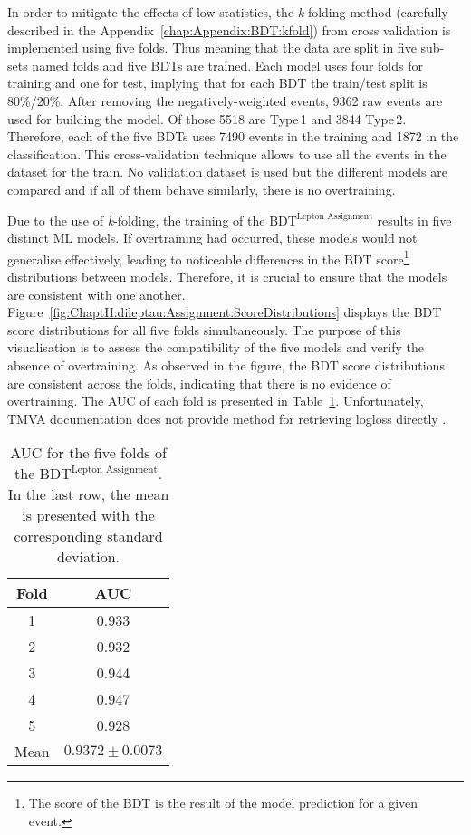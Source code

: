 In order to mitigate the effects of low statistics, the \textit{k}-folding method (carefully described in 
the Appendix~\ref{chap:Appendix:BDT:kfold}) from cross validation is implemented using five folds. 
Thus meaning that the data are split in five sub-sets named folds 
and five BDTs are trained. Each model uses four folds
for training and one for test, implying that for each BDT the train/test split is 80\%/20\%.
After removing the negatively-weighted events, 9362 raw events are used for building the model.
Of those 5518 are Type$\,$1 and 3844 Type$\,$2. Therefore, each of the five BDTs uses 7490 events
in the training and 1872 in the classification.
This cross-validation technique allows to use all the events in the dataset for the train. 
No validation dataset is used but the different models
are compared and if all of them behave similarly, there is no overtraining. 

 Due to the use of \textit{k}-folding, the training of the $\text{BDT}^{\text{Lepton Assignment}}$ results 
 in five distinct ML models. If overtraining had occurred, these models would not 
 generalise effectively, leading to noticeable differences in the BDT score\footnote{The 
 score of the BDT is the result of the model prediction for a given event.} distributions 
 between models. Therefore, it is crucial to ensure that the models are consistent 
 with one another. Figure~\ref{fig:ChaptH:dileptau:Assignment:ScoreDistributions} displays the BDT 
score distributions for all five folds simultaneously. The purpose of this visualisation 
is to assess the compatibility of the five models and verify the absence of overtraining. 
As observed in the figure, the BDT score distributions are consistent across the folds, 
indicating that there is no evidence of overtraining.
The AUC of each fold is presented in Table~\ref{tab:ChaptH:dileptau:Assignment:AUCs}.
Unfortunately, TMVA documentation does not provide method for retrieving logloss directly .

\begin{table}[h]
\centering
\begin{tabular}{c|c}
\toprule
Fold  & AUC                 \\ \midrule
     1 & 0.933               \\
     2 & 0.932               \\
     3 & 0.944               \\
     4 & 0.947               \\
     5 & 0.928               \\ \midrule
Mean & $0.9372 \pm 0.0073$ \\
\bottomrule
\end{tabular}
\caption{AUC for the five folds of the $\text{BDT}^{\text{Lepton Assignment}}$. 
In the last row, the mean is presented with the corresponding standard deviation.}
\label{tab:ChaptH:dileptau:Assignment:AUCs}
\end{table}

